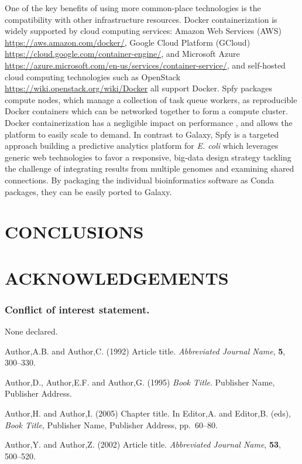 \documentclass[a4,center,fleqn]{NAR}
\begin{document}
One of the key benefits of using more common-place technologies is the compatibility with other infrastructure resources.
Docker containerization is widely supported by cloud computing services: Amazon Web Services (AWS) \url{https://aws.amazon.com/docker/}, Google Cloud Platform (GCloud) \url{https://cloud.google.com/container-engine/}, and Microsoft Azure \url{https://azure.microsoft.com/en-us/services/container-service/}, and self-hosted cloud computing technologies such as OpenStack \url{https://wiki.openstack.org/wiki/Docker} all support Docker.
Spfy packages compute nodes, which manage a collection of task queue workers, as reproducible Docker containers which can be networked together to form a compute cluster.
Docker containerization has a negligible impact on performance \cite{di2015impact}, and allows the platform to easily scale to demand.
In contrast to Galaxy, Spfy is a targeted approach building a predictive analytics platform for \textit{E. coli} which leverages generic web technologies to favor a responsive, big-data design strategy tackling the challenge \cite{fricke2014bacterial} of integrating results from multiple genomes and examining shared connections.
By packaging the individual bioinformatics software as Conda packages, they can be easily ported to Galaxy.

\section{CONCLUSIONS}

\section{ACKNOWLEDGEMENTS}


\subsubsection{Conflict of interest statement.} None declared.
\newpage


\begin{thebibliography}{4}

Author,A.B. and Author,C. (1992)
Article title.
\textit{Abbreviated Journal Name}, \textbf{5}, 300--330.

Author,D., Author,E.F. and Author,G. (1995)
\textit{Book Title}.
Publisher Name, Publisher Address.

Author,H. and Author,I. (2005)
Chapter title.
In
Editor,A. and Editor,B. (eds),
\textit{Book Title},
Publisher Name, Publisher Address,
pp.\ 60--80.

Author,Y. and Author,Z. (2002)
Article title.
\textit{Abbreviated Journal Name}, \textbf{53}, 500--520.

\end{thebibliography}
\end{document}

